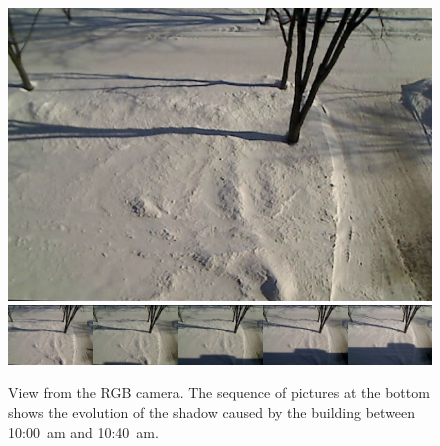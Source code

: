 \begin{figure}[h]
    \centering
    \includegraphics[width=0.90\linewidth]{./img/camera_view.jpg}
    \includegraphics[width=0.95\linewidth]{./img/shadow2.png}
    \caption{View from the RGB camera. The sequence of pictures at the bottom shows the evolution of the shadow caused by the building between 10:00~am and 10:40~am.}
    \label{fig:setup}
\end{figure}

